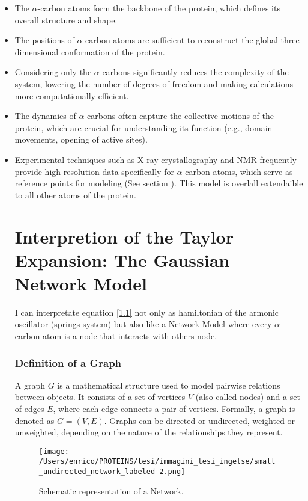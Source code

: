 \documentclass[English, Lau, oneside]{sapthesis}
\begin{document}
\begin{itemize}
    \item The \(\alpha\)-carbon atoms form the backbone of the protein, which defines its overall structure and shape.
    \item The positions of \(\alpha\)-carbon atoms are sufficient to reconstruct the global three-dimensional conformation of the protein.
    \item Considering only the \(\alpha\)-carbons significantly reduces the complexity of the system, lowering the number of degrees of freedom and making calculations more computationally efficient.
    \item The dynamics of \(\alpha\)-carbons often capture the collective motions of the protein, which are crucial for understanding its function (e.g., domain movements, opening of active sites).
    \item Experimental techniques such as X-ray crystallography and NMR frequently provide high-resolution data specifically for \(\alpha\)-carbon atoms, which serve as reference points for modeling (See section ).
This model is overlall extendaible to all other atoms of the protein.
\section{Interpretion of the Taylor Expansion: The Gaussian Network Model}
I can interpretate equation \eqref{1.1} not only as hamiltonian of the armonic oscillator  (springs-system) but also like a Network Model where every \(\alpha\)-carbon atom is a node that interacts with others node.
\subsubsection{Definition of a Graph}
A graph \( G \) is a mathematical structure used to model pairwise relations between objects. It consists of a set of vertices \( V \) (also called nodes) and a set of edges \( E \), where each edge connects a pair of vertices. Formally, a graph is denoted as \( G = (V, E) \). Graphs can be directed or undirected, weighted or unweighted, depending on the nature of the relationships they represent.

\begin{figure}[h]
    \centering
    \texttt{[image: /Users/enrico/PROTEINS/tesi/immagini\_tesi\_ingelse/small\_undirected\_network\_labeled-2.png]}    
    \caption{Schematic representation of a Network.}
    \label{fig:Network}
\end{figure}

\end{itemize}
\end{document}
